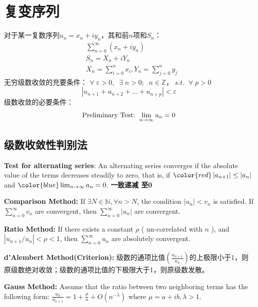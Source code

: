 \documentclass[10pt, a4paper, oneside]{ctexbook}
\begin{document}
\chapter{复变序列}
对于某一复数序列$u_n=x_n+iy_n$，其和前$n$项和$S_n$：
\begin{equation*}
    \begin{aligned}
    &\sum_{n=0}^{\infty}\left(x_{n}+i y_{n}\right) \\
    &S_{n}=X_{n}+i Y_{n} \\
    &X_{n}=\sum_{i=0}^{n} x_{i}, Y_{n}=\sum_{j=0}^{n} y_{j}
    \end{aligned}
\end{equation*}
无穷级数收敛的充要条件：
$\forall\; \varepsilon > 0,\;\; \exists\; n>0;\;\; n \in \mathbb{Z}， \; s.t.\;\; \forall \; p>0\:$
\begin{equation*}
    \left|u_{n+1}+u_{n+2}+\ldots+u_{n+p}\right|<\varepsilon
\end{equation*}
级数收敛的必要条件：
\begin{equation*}
    \text{\boldmath Preliminary Test: } \lim_{n\to \infty} u_n = 0
\end{equation*}
\section{级数收敛性判别法}
\textbf{Test for alternating series}: An alternating series converges if the absolute value of the terms decreases steadily to zero, that is, if $\color{red} \left|a_{n+1}\right| \leq\left|a_{n}\right|$ and $\color{blue} \lim _{n \rightarrow \infty} a_{n}=0$.
\textbf{\color{red} 一致递减 \color{blue}至0}

\textbf{Comparison Method: }If $\exists N \in \mathbb{N}, \forall n>N$, the condition $\left|u_{n}\right|<v_{n}$ is satisfied. If $\displaystyle \sum_{n=0}^{\infty} v_{n}$ are convergent, then $\displaystyle \sum_{n=0}^{\infty}\left|u_{n}\right|$ are convergent.

\textbf{Ratio Method: }If there exists a constant $\rho$ ({\color{red} un-correlated with $n$ }), and $\left|u_{n+1} / u_{n}\right|<\rho<1$, then $\displaystyle \sum_{n=0}^{\infty} u_{n}$ are absolutely convergent.

\textbf{d'Alembert Method(Criterion): }级数的通项比值$\left(\displaystyle \frac{u_{n+1}}{u_n}\right)$的上极限小于$1$，则原级数绝对收敛；级数的通项比值的下极限大于1，则原级数发散。

\textbf{Gauss Method: }Assume that the ratio between two neighboring terms has the following form: $\displaystyle \frac{u_{n}}{u_{n+1}}=1+\frac{\mu}{n}+O\left(n^{-\lambda}\right)$
where $\mu=a+i b, \lambda>1$. 
\end{document}
